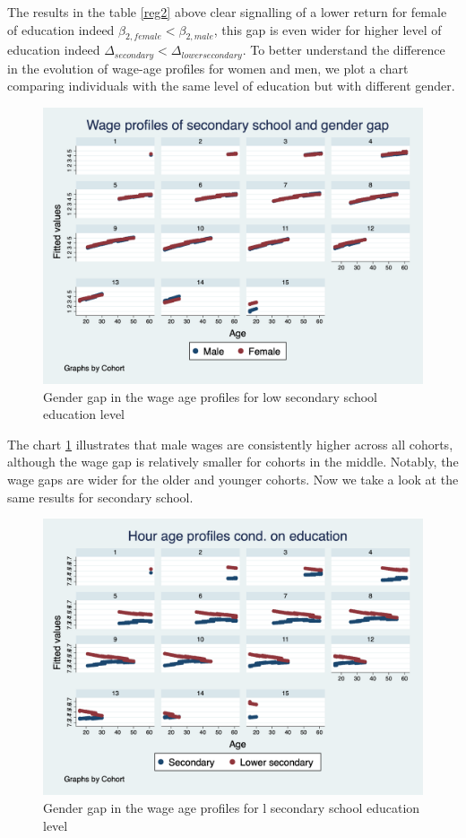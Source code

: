 \documentclass[14pt]{sistedes}
\begin{document}
The results in the table \ref{reg2} above clear signalling of a lower return for female of education indeed $\beta_{2,female}<\beta_{2,male}$, this gap is even wider for higher level of education indeed \(\Delta_{secondary}<\Delta_{lower secondary}\).
To better understand the difference in the evolution of wage-age profiles for women and men, we plot a chart comparing individuals with the same level of education but with different gender.
\begin{figure}
    \centering
    \includegraphics[scale=0.3]{graph3.png}
    \caption{Gender gap in the wage age profiles for low secondary school education level}
    \label{fig:w_gend_l}
\end{figure}
The chart \ref{fig:w_gend_l} illustrates that male wages are consistently higher across all cohorts, although the wage gap is relatively smaller for cohorts in the middle. Notably, the wage gaps are wider for the older and younger cohorts. 
Now we take a look at the same results for secondary school. 
\begin{figure}
    \centering
    \includegraphics[scale=0.3]{graph4.png}
    \caption{Gender gap in the wage age profiles for l secondary school education level}
    \label{fig:w_gend_h}
\end{figure}
\end{document}
